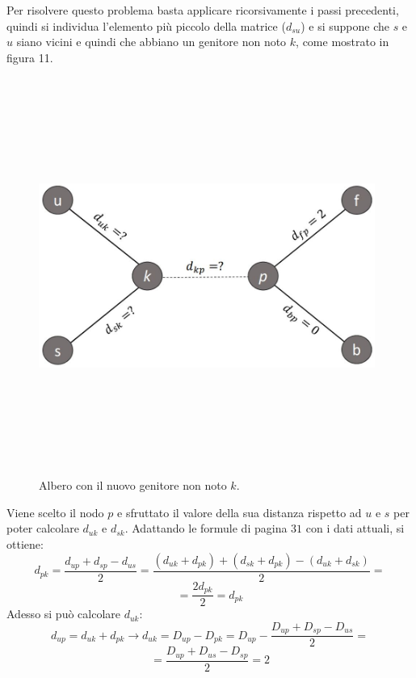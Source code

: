 Per risolvere questo problema basta applicare ricorsivamente i passi precedenti, quindi si individua l'elemento più piccolo della matrice ($d_{su}$) e si suppone che $s$ e $u$ siano vicini e quindi che abbiano un genitore non noto $k$, come mostrato in figura 11.
\newpage
\begin{figure}[h!]
\centering
	\includegraphics[height=13cm, width=11cm, keepaspectratio]{distance_between_s_u.jpg}
 	\caption{Albero con il nuovo genitore non noto $k$.}
  	\label{fig:neighborsleaves_3}
\end{figure}
Viene scelto il nodo $p$ e sfruttato il valore della sua distanza rispetto ad $u$ e $s$ per poter calcolare $d_{uk}$ e $d_{sk}$. Adattando le formule di pagina $31$ con i dati attuali, si ottiene:
\[d_{pk}=\frac{d_{up}+d_{sp}-d_{us}}2=
\frac{(d_{uk}+d_{pk})+(d_{sk}+d_{pk})-(d_{uk}+d_{sk})}2=\]
\[=\frac{2d_{pk}}2=d_{pk}
\]
Adesso si può calcolare $d_{uk}$:
\[d_{up}=d_{uk}+d_{pk} \rightarrow d_{uk}=D_{up}-D_{pk}=D_{up}-\frac{D_{up}+D_{sp}-D_{us}}2=\]
\[=\frac{D_{up}+D_{us}-D_{sp}}2=2\]

